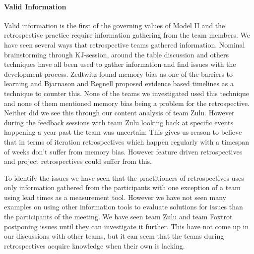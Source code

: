 \paragraph{Valid Information}
\label{section:valid-information}
Valid information is the first of the governing values of Model II and the retrospective practice require information gathering from the team members. We have seen several ways that retrospective teams gathered information. Nominal brainstorming through KJ-session, around the table discussion and others techniques have all been used to gather information and find issues with the development process. Zedtwitz\cite{Zedtwitz2002} found memory bias as one of the barriers to learning and Bjarnason and Regnell\cite{Bjarnason2012} proposed evidence based timelines as a technique to counter this. None of the teams we investigated used this technique and none of them mentioned memory bias being a problem for the retrospective. Neither did we see this through our content analysis of team Zulu. However during the feedback sessions with team Zulu looking back at specific events happening a year past the team was uncertain. This gives us reason to believe that in terms of iteration retrospectives which happen regularly with a timespan of weeks don't suffer from memory bias. However feature driven retrospectives and project retrospectives could suffer from this. 

To identify the issues we have seen that the practitioners of retrospectives uses only information gathered from the participants with one exception of a team using lead times as a measurement tool. However we have not seen many examples on using other information tools to evaluate solutions for issues than the participants of the meeting. We have seen team Zulu and team Foxtrot postponing issues until they can investigate it further. This have not come up in our discussions with other teams, but it can seem that the teams during retrospectives acquire knowledge when their own is lacking.

